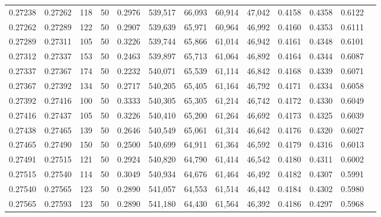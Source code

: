\begin{tabular}{rrrrrrrrrrrrr}
0.27238 & 0.27262 &   118 &  50 &                                     0.2976 & 539,517 &  66,093 &  60,914 &  47,042 & 0.4158 & 0.4358 & 0.6122 \\
0.27262 & 0.27289 &   122 &  50 &                                     0.2907 & 539,639 &  65,971 &  60,964 &  46,992 & 0.4160 & 0.4353 & 0.6111 \\
0.27289 & 0.27311 &   105 &  50 &                                     0.3226 & 539,744 &  65,866 &  61,014 &  46,942 & 0.4161 & 0.4348 & 0.6101 \\
0.27312 & 0.27337 &   153 &  50 &                                     0.2463 & 539,897 &  65,713 &  61,064 &  46,892 & 0.4164 & 0.4344 & 0.6087 \\
0.27337 & 0.27367 &   174 &  50 &                                     0.2232 & 540,071 &  65,539 &  61,114 &  46,842 & 0.4168 & 0.4339 & 0.6071 \\
0.27367 & 0.27392 &   134 &  50 &                                     0.2717 & 540,205 &  65,405 &  61,164 &  46,792 & 0.4171 & 0.4334 & 0.6058 \\
0.27392 & 0.27416 &   100 &  50 &                                     0.3333 & 540,305 &  65,305 &  61,214 &  46,742 & 0.4172 & 0.4330 & 0.6049 \\
0.27416 & 0.27437 &   105 &  50 &                                     0.3226 & 540,410 &  65,200 &  61,264 &  46,692 & 0.4173 & 0.4325 & 0.6039 \\
0.27438 & 0.27465 &   139 &  50 &                                     0.2646 & 540,549 &  65,061 &  61,314 &  46,642 & 0.4176 & 0.4320 & 0.6027 \\
0.27465 & 0.27490 &   150 &  50 &                                     0.2500 & 540,699 &  64,911 &  61,364 &  46,592 & 0.4179 & 0.4316 & 0.6013 \\
0.27491 & 0.27515 &   121 &  50 &                                     0.2924 & 540,820 &  64,790 &  61,414 &  46,542 & 0.4180 & 0.4311 & 0.6002 \\
0.27515 & 0.27540 &   114 &  50 &                                     0.3049 & 540,934 &  64,676 &  61,464 &  46,492 & 0.4182 & 0.4307 & 0.5991 \\
0.27540 & 0.27565 &   123 &  50 &                                     0.2890 & 541,057 &  64,553 &  61,514 &  46,442 & 0.4184 & 0.4302 & 0.5980 \\
0.27565 & 0.27593 &   123 &  50 &                                     0.2890 & 541,180 &  64,430 &  61,564 &  46,392 & 0.4186 & 0.4297 & 0.5968 \\

\end{tabular}
